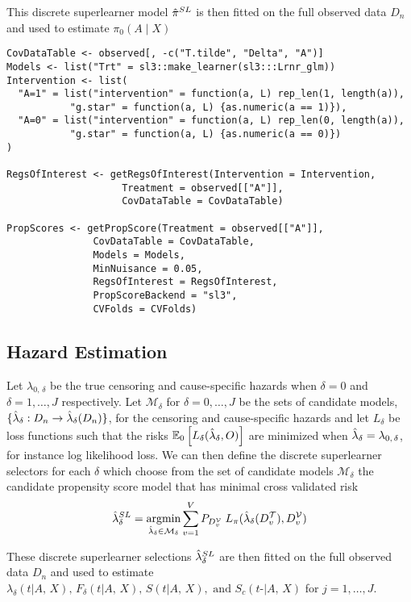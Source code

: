 \documentclass{report}
\newcommand{\1}{\ensuremath{\mathbf{1}}}
\DeclareMathOperator*{\argmin}{argmin}
\newcommand{\X}{\ensuremath{{X}}}
\newcommand{\AX}{\ensuremath{\mid A,\,{X}}}
\begin{document}
This discrete superlearner model \(\Hat{\pi}^{SL}\) is then fitted on the full observed data \(D_n\) and used to estimate \(\pi_0(A \mid \X)\)

\begin{lstlisting}
CovDataTable <- observed[, -c("T.tilde", "Delta", "A")]
Models <- list("Trt" = sl3::make_learner(sl3:::Lrnr_glm))
Intervention <- list(
  "A=1" = list("intervention" = function(a, L) rep_len(1, length(a)),
	       "g.star" = function(a, L) {as.numeric(a == 1)}),
  "A=0" = list("intervention" = function(a, L) rep_len(0, length(a)),
	       "g.star" = function(a, L) {as.numeric(a == 0)})
)

RegsOfInterest <- getRegsOfInterest(Intervention = Intervention,
				    Treatment = observed[["A"]],
				    CovDataTable = CovDataTable)

PropScores <- getPropScore(Treatment = observed[["A"]],
			   CovDataTable = CovDataTable,
			   Models = Models,
			   MinNuisance = 0.05,
			   RegsOfInterest = RegsOfInterest,
			   PropScoreBackend = "sl3",
			   CVFolds = CVFolds)
\end{lstlisting}

\subsection*{Hazard Estimation}
\label{sec:org85ca41d}
Let \(\lambda_{0,\,\delta}\) be the true censoring and cause-specific hazards when \(\delta = 0\) and \(\delta = 1, \dots, J\) respectively. Let \(\mathcal{M}_\delta\) for \(\delta = 0, \dots, J\) be the sets of candidate models, \(\{\Hat{\lambda}_\delta : D_n \to \Hat{\lambda}_\delta(D_n)\}\), for the censoring and cause-specific hazards and let \(L_\delta\) be loss functions such that the risks \(\mathbb{E}_0\left[L_\delta(\Hat{\lambda}_\delta, O)\right]\) are minimized when \(\Hat{\lambda}_\delta = \lambda_{0,\,\delta}\), for instance log likelihood loss. We can then define the discrete superlearner selectors for each \(\delta\) which choose from the set of candidate models \(\mathcal{M_\delta}\) the candidate propensity score model that has minimal cross validated risk 
\[ \Hat{\lambda}_\delta^{SL} = \argmin_{\Hat{\lambda}_\delta \in \mathcal{M}_\delta} \sum_{v = 1}^{V} P_{D^\mathcal{V}_v} \; L_\pi(\Hat{\lambda}_\delta(D^\mathcal{T}_v), D^\mathcal{V}_v)\]

These discrete superlearner selections \(\Hat{\lambda}_\delta^{SL}\) are then fitted on the full observed data \(D_n\) and used to estimate \(\lambda_\delta(t \AX), \, F_\delta(t \AX),\, S(t \AX), \text{ and } S_c(t\text{-} \AX)\) for \(j = 1,\dots, J\).
\end{document}
